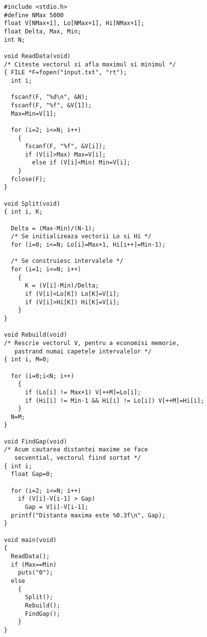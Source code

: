 \begin{verbatim}
#include <stdio.h>
#define NMax 5000
float V[NMax+1], Lo[NMax+1], Hi[NMax+1];
float Delta, Max, Min;
int N;

void ReadData(void)
/* Citeste vectorul si afla maximul si minimul */
{ FILE *F=fopen("input.txt", "rt");
  int i;

  fscanf(F, "%d\n", &N);
  fscanf(F, "%f", &V[1]);
  Max=Min=V[1];

  for (i=2; i<=N; i++)
    {
      fscanf(F, "%f", &V[i]);
      if (V[i]>Max) Max=V[i];
        else if (V[i]<Min) Min=V[i];
    }
  fclose(F);
}

void Split(void)
{ int i, K;

  Delta = (Max-Min)/(N-1);
  /* Se initializeaza vectorii Lo si Hi */
  for (i=0; i<=N; Lo[i]=Max+1, Hi[i++]=Min-1);

  /* Se construiesc intervalele */
  for (i=1; i<=N; i++)
    {
      K = (V[i]-Min)/Delta;
      if (V[i]<Lo[K]) Lo[K]=V[i];
      if (V[i]>Hi[K]) Hi[K]=V[i];
    }
}

void Rebuild(void)
/* Rescrie vectorul V, pentru a economisi memorie,
   pastrand numai capetele intervalelor */
{ int i, M=0;

  for (i=0;i<N; i++)
    {
      if (Lo[i] != Max+1) V[++M]=Lo[i];
      if (Hi[i] != Min-1 && Hi[i] != Lo[i]) V[++M]=Hi[i];
    }
  N=M;
}

void FindGap(void)
/* Acum cautarea distantei maxime se face
   secvential, vectorul fiind sortat */
{ int i;
  float Gap=0;

  for (i=2; i<=N; i++)
    if (V[i]-V[i-1] > Gap)
      Gap = V[i]-V[i-1];
  printf("Distanta maxima este %0.3f\n", Gap);
}

void main(void)
{
  ReadData();
  if (Max==Min)
    puts("0");
  else
    {
      Split();
      Rebuild();
      FindGap();
    }
}
\end{verbatim}
